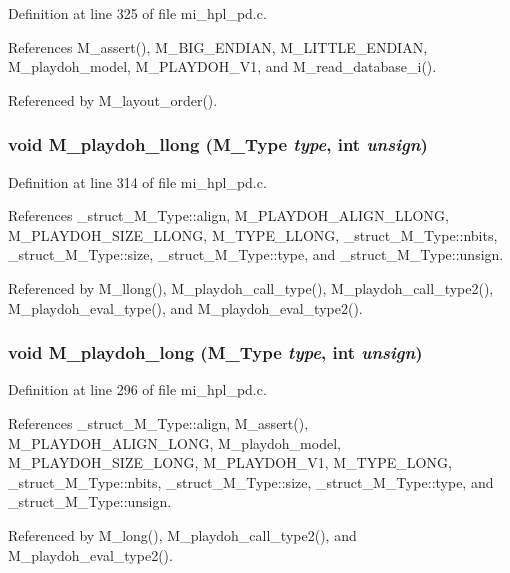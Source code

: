 Definition at line 325 of file mi\_\-hpl\_\-pd.c.

References M\_\-assert(), M\_\-BIG\_\-ENDIAN, M\_\-LITTLE\_\-ENDIAN, M\_\-playdoh\_\-model, M\_\-PLAYDOH\_\-V1, and M\_\-read\_\-database\_\-i().

Referenced by M\_\-layout\_\-order().
\subsubsection{\setlength{\rightskip}{0pt plus 5cm}void M\_\-playdoh\_\-llong (\bf{M\_\-Type} {\em type}, int {\em unsign})}\label{mi__hpl__pd_8c_0f6e274c29e7f7dba295ed2f365782b2}




Definition at line 314 of file mi\_\-hpl\_\-pd.c.

References \_\-struct\_\-M\_\-Type::align, M\_\-PLAYDOH\_\-ALIGN\_\-LLONG, M\_\-PLAYDOH\_\-SIZE\_\-LLONG, M\_\-TYPE\_\-LLONG, \_\-struct\_\-M\_\-Type::nbits, \_\-struct\_\-M\_\-Type::size, \_\-struct\_\-M\_\-Type::type, and \_\-struct\_\-M\_\-Type::unsign.

Referenced by M\_\-llong(), M\_\-playdoh\_\-call\_\-type(), M\_\-playdoh\_\-call\_\-type2(), M\_\-playdoh\_\-eval\_\-type(), and M\_\-playdoh\_\-eval\_\-type2().
\subsubsection{\setlength{\rightskip}{0pt plus 5cm}void M\_\-playdoh\_\-long (\bf{M\_\-Type} {\em type}, int {\em unsign})}\label{mi__hpl__pd_8c_64402803c800733e382f50b11c1bd10d}




Definition at line 296 of file mi\_\-hpl\_\-pd.c.

References \_\-struct\_\-M\_\-Type::align, M\_\-assert(), M\_\-PLAYDOH\_\-ALIGN\_\-LONG, M\_\-playdoh\_\-model, M\_\-PLAYDOH\_\-SIZE\_\-LONG, M\_\-PLAYDOH\_\-V1, M\_\-TYPE\_\-LONG, \_\-struct\_\-M\_\-Type::nbits, \_\-struct\_\-M\_\-Type::size, \_\-struct\_\-M\_\-Type::type, and \_\-struct\_\-M\_\-Type::unsign.

Referenced by M\_\-long(), M\_\-playdoh\_\-call\_\-type2(), and M\_\-playdoh\_\-eval\_\-type2().
